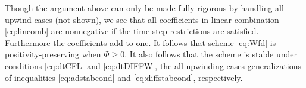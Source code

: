 \documentclass[11pt,final]{amsart}%
\begin{document}
Though the argument above can only be made fully rigorous by handling all upwind cases (not shown), we see that all coefficients in linear combination \eqref{eq:lincomb} are nonnegative if the time step restrictions are satisfied.  Furthermore the coefficients add to one.  It follows \citep{MortonMayers} that scheme \eqref{eq:Wfd} is positivity-preserving when $\Phi\ge 0$.  It also follows that the scheme is stable under conditions \eqref{eq:dtCFL} and \eqref{eq:dtDIFFW}, the all-upwinding-cases generalizations of inequalities \eqref{eq:adstabcond} and \eqref{eq:diffstabcond}, respectively.
\end{document}
